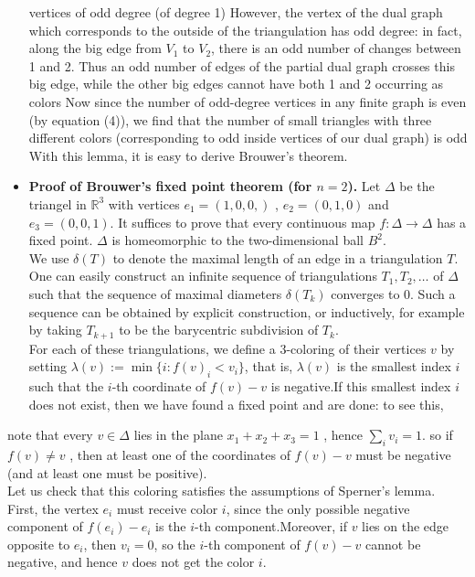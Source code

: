 \documentclass[10pt,twoside]{book}
\begin{document}
\begin{itemize}
					vertices of odd degree (of degree 1)  However, the vertex of the dual graph which corresponds to the outside of the triangulation has odd degree: in fact, along the big edge from $V_1$ to $V_2$, there is an odd number of changes between 1 and 2. Thus an odd number of edges of the partial dual graph crosses this big edge, while the other big edges cannot have both 1 and 2 occurring as colors Now since the number of odd-degree vertices in any finite graph is even (by equation (4)), we find that the number of small triangles with three different colors (corresponding to odd inside vertices of our dual graph) is odd With this lemma, it is easy to derive Brouwer’s theorem.
				\item[\textcolor{black}{\rule{1ex}{1ex}}] \textbf{Proof of Brouwer’s fixed point theorem (for $n = 2$).} Let $\Delta$ be the triangel in $ \mathbb{R}^3 $ with vertices $e_1 = (1,0,0,)$ , $e_2 = (0,1,0)$ and $e_3 = (0,0,1)$. It suffices to prove that every continuous map $f: \Delta \rightarrow \Delta$ has a fixed point. $\Delta$ is homeomorphic to the two-dimensional ball $B^2$.\\
				We use $\delta(T)$ to denote the maximal length of an edge in a triangulation $T$. One can easily construct an infinite sequence of triangulations $T_1, T_2, \ldots$ of $\Delta$ such that the sequence of maximal diameters $\delta(T_k)$ converges to 0. Such a sequence can be obtained by explicit construction, or inductively, for example by taking $T_{k+1}$ to be the barycentric subdivision of $T_k$.\\
				For each of these triangulations, we define a 3-coloring of their vertices $v$ by setting $\lambda(v) := \min\{i : f(v)_i < v_i\}$, that is, $\lambda(v)$ is the smallest index $i$ such that the $i$-th coordinate of $f(v)-v$ is negative.If this smallest index $i$ does not exist, then we have found a fixed point and are done: to see this, 
			\end{itemize}
			note that every $v \in \Delta$ lies in the plane $x_1 + x_2 + x_3 = 1$ , hence $\sum_{i} v_i =1 .$ so if $f(v)\neq{v}$ , then at least one of the coordinates of $f(v)- v$ must be negative (and at least one must be positive).\\
			Let us check that this coloring satisfies the assumptions of Sperner’s lemma. First, the vertex $e_i$ must receive color $i$, since the only possible negative
			component of $f(e_i)-e_i$ is the $i$-th component.Moreover, if $v$ lies on the edge opposite to $e_i$, then $v_i = 0$, so the $i$-th component of $f(v)-v$ cannot be negative, and hence $v$ does not get the color $i$.\\
\end{document}
